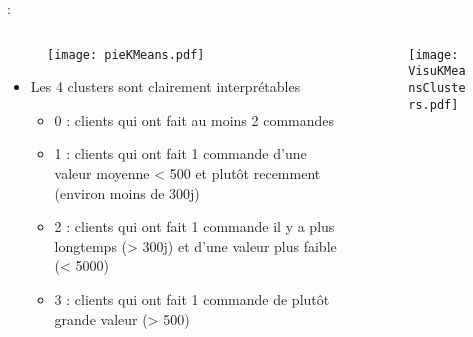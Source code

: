 \documentclass[8pt,aspectratio=169,hyperref={unicode=true}]{beamer}
\begin{document}
\begin{frame}{\insertsection: \insertsubsection}
    \begin{columns}
        \begin{column}{.55\textwidth}
            \begin{figure}
                \texttt{[image: pieKMeans.pdf]}
            \end{figure}
            \begin{itemize}
                \item Les 4 clusters sont clairement interprétables
                      \begin{itemize}
                          \item 0 : clients qui ont fait au moins 2 commandes
                          \item 1 : clients qui ont fait 1 commande d'une valeur moyenne < 500 et plutôt recemment (environ moins de 300j)
                          \item 2 : clients qui ont fait 1 commande il y a plus longtemps (> 300j) et d'une valeur plus faible (< 5000)
                          \item 3 : clients qui ont fait 1 commande de plutôt grande valeur (> 500)
                      \end{itemize}
            \end{itemize}
        \end{column}
        \begin{column}{.45\textwidth}
            \begin{figure}
                \texttt{[image: VisuKMeansClusters.pdf]}
            \end{figure}
        \end{column}
    \end{columns}
\end{frame}
\end{document}
